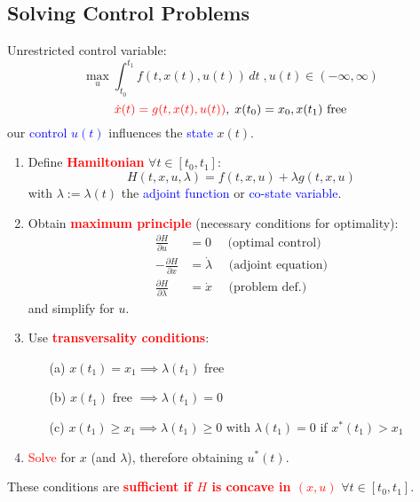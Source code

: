 \documentclass[a4paper, 10pt]{article}
\newcommand{\red}[1]{\textcolor{red}{#1}}
\newcommand{\bigred}[1]{\textcolor{red}{\textbf{#1}}}
\newcommand{\blue}[1]{\textcolor{blue}{#1}}
\theoremstyle{definition}
\begin{document}
\begin{multicols*}{4}


    \section*{Solving Control Problems}
    Unrestricted control variable:
    \[
        \max_u \int_{t_0}^{t_1} f(t, x(t), u(t)) \, dt
        \;, u(t) \in (-\infty, \infty)
    \]
    \[
        \red{\dot{x} (t) = g(t, x(t), u(t))},
        \; x(t_0) = x_0, x(t_1) \text{ free}
    \]
    our \blue{control $u(t)$} influences the \blue{state} $x(t)$.
    \begin{enumerate}
        \item Define \bigred{Hamiltonian} $\forall t \in [t_0, t_1]$:
        \[
            H(t, x, u, \lambda) = f(t, x, u) + \lambda g(t, x, u)
        \]
        with $\lambda := \lambda(t)$ the \blue{adjoint function} or 
        \blue{co-state variable}.
        \item Obtain \bigred{maximum principle} (necessary conditions for optimality):
        \begin{align}
            \frac{\partial H}{\partial u} &= 0 \quad \text{ (optimal control)} \\
            - \frac{\partial H}{\partial x} &= \dot{\lambda} \quad \text{ (adjoint equation)} \\
            \frac{\partial H}{\partial \lambda} &= \dot{x} \quad \text{ (problem def.)}
        \end{align}
        and simplify for $u$.
        \item Use \bigred{transversality conditions}:
        \begin{enumerate}
            \item[(a)] $x(t_1) = x_1 \implies \lambda(t_1)$ free
            \item[(b)] $x(t_1) \text{ free } \implies \lambda(t_1) = 0$
            \item[(c)] $x(t_1) \ge x_1 \implies \lambda(t_1) \ge 0$ 
            with $\lambda(t_1) = 0$ if $x^*(t_1) > x_1$
        \end{enumerate}
        \item \red{Solve} for $x$ (and $\lambda$), therefore obtaining $u^*(t)$.
    \end{enumerate}
    These conditions are \bigred{sufficient if $H$ is concave in $(x, u)$} 
    $\forall t \in [t_0, t_1]$.

\end{multicols*}
\end{document}
